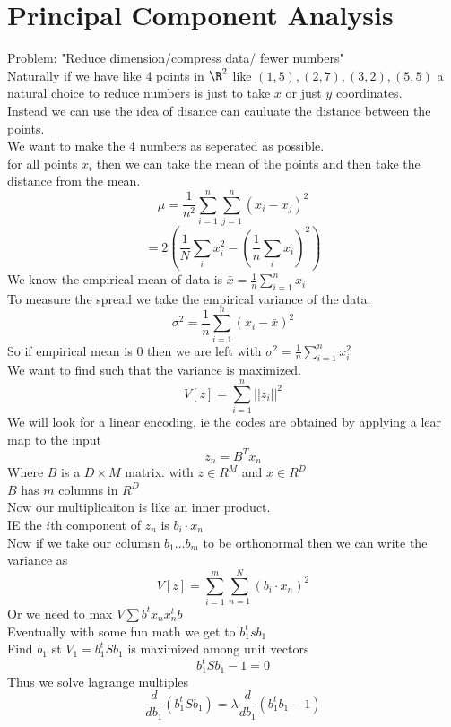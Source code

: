 \documentclass[answers,12pt,addpoints]{exam}
\begin{document}
\section{Principal Component Analysis}
Problem: "Reduce dimension/compress data/ fewer numbers"\\
Naturally if we have like 4 points in $\R^2$ like $(1,5), (2,7), (3, 2), (5,5)$ a natural choice to reduce numbers is just to take $x$ or just $y$ coordinates. \\
Instead we can use the idea of disance can cauluate the distance between the points. \\
We want to make the 4 numbers as seperated as possible. \\
for all points $x_i$ then we can take the mean of the points and then take the distance from the mean. \\
$$\mu = \frac{1}{n^2} \sum_{i=1}^n \sum_{j=1}^n (x_i - x_j)^2$$
$$ = {2} ( \frac{1}{N} \sum_i x_i^2 - \left(\frac{1}{n} \sum_i x_i\right)^2)$$
We know the empirical mean of data is $\bar{x} = \frac{1}{n} \sum_{i=1}^n x_i$ \\
To measure the spread we take the empirical variance of the data. \\
$$\sigma^2 = \frac{1}{n} \sum_{i=1}^n (x_i - \bar{x})^2$$
So if empirical mean is 0 then we are left with $\sigma^2 = \frac{1}{n} \sum_{i=1}^n x_i^2$ \\
We want to find such that the variance is maximized. \\
$$ V[z] = \sum_{i=1}^n ||z_i||^2$$
We will look for a linear encoding, ie the codes are obtained by applying a lear map to the input
$$ z_n = B^T x_n$$
Where $B$ is a $D \times M$ matrix. with $z \in R^M$ and $x \in R^D$ \\
$B$ has $m$ columns in $R^D$ \\
Now our multiplicaiton is like an inner product. \\
IE the $i$th component of $z_n$ is $b_i \cdot x_n$ \\
Now if we take our columsn $b_1 ... b_m$ to be orthonormal then we can write the variance as \\
$$ V[z] = \sum_{i=1}^m \sum_{n=1}^N (b_i \cdot x_n)^2$$
Or we need to max $V\sum b^t x_n x_n^t b$ \\
Eventually with some fun math we get to $b^t_1 s b_1$ \\
Find $b_1$ st $V_1 = b_1^t S b_1$ is maximized among unit vectors 
$$ b_1^t S b_1 - 1 = 0$$
Thus we solve lagrange multiples 
$$ \frac{d}{db_1} (b_1^t S b_1) = \lambda \frac{d}{db_1} (b_1^t b_1 - 1)$$
\end{document}
